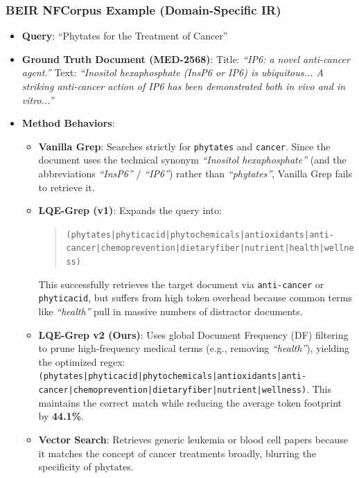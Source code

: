 \documentclass[11pt,a4paper]{article}
\begin{document}
\subsubsection{BEIR NFCorpus Example (Domain-Specific IR)}
\begin{itemize}
    \item \textbf{Query}: ``Phytates for the Treatment of Cancer''
    \item \textbf{Ground Truth Document (MED-2568)}: Title: \textit{``IP6: a novel anti-cancer agent.''} Text: \textit{``Inositol hexaphosphate (InsP6 or IP6) is ubiquitous... A striking anti-cancer action of IP6 has been demonstrated both in vivo and in vitro...''}
    \item \textbf{Method Behaviors}:
    \begin{itemize}
        \item \textbf{Vanilla Grep}: Searches strictly for \texttt{phytates} and \texttt{cancer}. Since the document uses the technical synonym \textit{``Inositol hexaphosphate''} (and the abbreviations \textit{``InsP6''} / \textit{``IP6''}) rather than \textit{``phytates''}, Vanilla Grep fails to retrieve it.
        \item \textbf{LQE-Grep (v1)}: Expands the query into:
        \begin{quote}
            \texttt{(phytates|phyticacid|phytochemicals|antioxidants|anti-cancer|chemoprevention|dietaryfiber|nutrient|health|wellness)}
        \end{quote}
        This successfully retrieves the target document via \texttt{anti-cancer} or \texttt{phyticacid}, but suffers from high token overhead because common terms like \textit{``health''} pull in massive numbers of distractor documents.
        \item \textbf{LQE-Grep v2 (Ours)}: Uses global Document Frequency (DF) filtering to prune high-frequency medical terms (e.g., removing \textit{``health''}), yielding the optimized regex:
        \texttt{(phytates|phyticacid|phytochemicals|antioxidants|anti-cancer|chemoprevention|dietaryfiber|nutrient|wellness)}. This maintains the correct match while reducing the average token footprint by \textbf{44.1\%}.
        \item \textbf{Vector Search}: Retrieves generic leukemia or blood cell papers because it matches the concept of cancer treatments broadly, blurring the specificity of phytates.
    \end{itemize}
\end{itemize}
\end{document}
